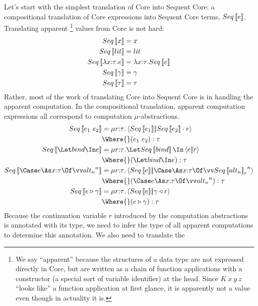 \documentclass{article}
\begin{document}
Let's start with the simplest translation of Core into Sequent Core: a
compositional translation of Core expressions into Sequent Core terms,
$Seq\left\llbracket{e}\right\rrbracket$.  Translating apparent%
\footnote{We say ``apparent'' because the structures of a data type are not
  expressed directly in Core, but are written as a chain of function
  applications with a constructor (a special sort of variable identifier) at the
  head.  Since $K~x~y~z$ ``looks like'' a function application at first glance,
  it is apparently not a value even though in actuality it is.}
values from Core is not hard:
\begin{align*}
  Seq\left\llbracket{x}\right\rrbracket &= x
  \\
  Seq\left\llbracket{lit}\right\rrbracket &= lit
  \\
  Seq\left\llbracket{\lambda{x{:}{\tau}}. e}\right\rrbracket
  &=
  \lambda{x{:}{\tau}}. Seq\left\llbracket{e}\right\rrbracket
  \\
  Seq\left\llbracket{\gamma}\right\rrbracket &= \gamma
  \\
  Seq\left\llbracket{\tau}\right\rrbracket &= \tau
\end{align*}
Rather, most of the work of translating Core into Sequent Core is in handling
the apparent computation.  In the compositional translation, apparent
computation expressions all correspond to computation $\mu$-abstractions.
\begin{align*}
  Seq\trans{\expr_1 ~ \expr_2}
  &=
  \comp{\ann r \ty}
    \cut
    {Seq\trans{\expr_1}}
    {\app{Seq\trans{\expr_2}}{r}}
  \\
  &
  \Where{}
    (\expr_1 ~ \expr_2) : \ty
  \\
  Seq\trans{\Let \abind \In \expr}
  &=
  \comp{\ann r \ty}\Let Seq\trans{\abind} \In \cut{\expr}{r}
  \\
  &
  \Where{}
    (\Let \abind \In \expr) : \ty
  \\
  Seq\trans{\Case \expr \As \ann{x}{\ty} \Of \vect[n]{\analt_n}}
  &=
  \comp{\ann{r}{\ty}}
    \cut
    {Seq\trans{\expr}}
    {\caseas{\ann{x}{\ty}}{\vect[n]{Seq\trans{\analt_n}_{r}}}}
  \\
  &
  \Where{}
    (\Case \expr \As \ann{x}{\ty} \Of \vect[n]{\analt_n}) : \ty
  \\
  Seq\trans{\coerce{\expr}{\cn}}
  &=
  \comp{\ann{r}{\ty}}\cut{Seq\trans{\expr}}{\koerce{\cn}{r}}
  \\
  &
  \Where{}
    (\coerce{\expr}{\cn}) : \ty
\end{align*}
Because the continuation variable $r$ introduced by the computation abstractions
is annotated with its type, we need to infer the type of all apparent
computations to determine this annotation.  We also need to translate the
\end{document}
